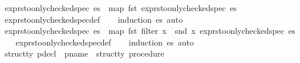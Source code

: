 \begin{isabellebody}
\ exprs{\isacharunderscore}{\kern0pt}to{\isacharunderscore}{\kern0pt}only{\isacharunderscore}{\kern0pt}checked{\isacharunderscore}{\kern0pt}spec{\isacharunderscore}{\kern0pt}{}{\isacharcolon}{\kern0pt}\ {\isachardoublequoteopen}es\ {\isacharequal}{\kern0pt}\ map\ fst\ {\isacharparenleft}{\kern0pt}exprs{\isacharunderscore}{\kern0pt}to{\isacharunderscore}{\kern0pt}only{\isacharunderscore}{\kern0pt}checked{\isacharunderscore}{\kern0pt}spec\ es{\isacharparenright}{\kern0pt}{\isachardoublequoteclose}\isanewline
%
\isadelimproof
\ \ %
\endisadelimproof
%
\isatagproof
{}\isamarkupfalse%
\ exprs{\isacharunderscore}{\kern0pt}to{\isacharunderscore}{\kern0pt}only{\isacharunderscore}{\kern0pt}checked{\isacharunderscore}{\kern0pt}spec{\isacharunderscore}{\kern0pt}def\isanewline
\ \ \isamarkupfalse%
\ {\isacharparenleft}{\kern0pt}induction\ es{\isacharparenright}{\kern0pt}\ auto%
\endisatagproof
{\isafoldproof}%
%
\isadelimproof
\isanewline
%
\endisadelimproof
\isanewline
{}\isamarkupfalse%
\ exprs{\isacharunderscore}{\kern0pt}to{\isacharunderscore}{\kern0pt}only{\isacharunderscore}{\kern0pt}checked{\isacharunderscore}{\kern0pt}spec{\isacharunderscore}{\kern0pt}{}{\isacharcolon}{\kern0pt}\ {\isachardoublequoteopen}es\ {\isacharequal}{\kern0pt}\ map\ fst\ {\isacharparenleft}{\kern0pt}filter\ {\isacharparenleft}{\kern0pt}{\isasymlambda}x{\isachardot}{\kern0pt}\ {\isasymnot}\ snd\ x{\isacharparenright}{\kern0pt}\ {\isacharparenleft}{\kern0pt}exprs{\isacharunderscore}{\kern0pt}to{\isacharunderscore}{\kern0pt}only{\isacharunderscore}{\kern0pt}checked{\isacharunderscore}{\kern0pt}spec\ es{\isacharparenright}{\kern0pt}{\isacharparenright}{\kern0pt}{\isachardoublequoteclose}\isanewline
%
\isadelimproof
\ \ %
\endisadelimproof
%
\isatagproof
{}\isamarkupfalse%
\ exprs{\isacharunderscore}{\kern0pt}to{\isacharunderscore}{\kern0pt}only{\isacharunderscore}{\kern0pt}checked{\isacharunderscore}{\kern0pt}spec{\isacharunderscore}{\kern0pt}def\isanewline
\ \ \isamarkupfalse%
\ {\isacharparenleft}{\kern0pt}induction\ es{\isacharparenright}{\kern0pt}\ auto%
\endisatagproof
{\isafoldproof}%
%
\isadelimproof
\isanewline
%
\endisadelimproof
\isanewline
{}\isamarkupfalse%
\ {\isacharprime}{\kern0pt}struct{\isacharunderscore}{\kern0pt}ty\ pdecl\ {\isacharequal}{\kern0pt}\ {\isachardoublequoteopen}pname\ {\isasymtimes}\ {\isacharprime}{\kern0pt}struct{\isacharunderscore}{\kern0pt}ty\ procedure{\isachardoublequoteclose}%

\end{isabellebody}
